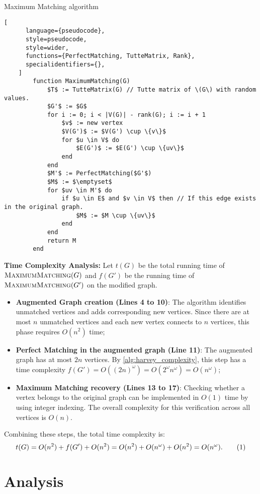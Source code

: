 \begin{programruledcaption}{Maximum Matching algorithm}
    \begin{lstlisting}[
      language={pseudocode},
      style=pseudocode,
      style=wider,
      functions={PerfectMatching, TutteMatrix, Rank},
      specialidentifiers={},
    ]
        function MaximumMatching(G)
            $T$ := TutteMatrix(G) // Tutte matrix of \(G\) with random values.
            $G'$ := $G$
            for i := 0; i < |V(G)| - rank(G); i := i + 1 
                $v$ := new vertex
                $V(G')$ := $V(G') \cup \{v\}$
                for $u \in V$ do 
                    $E(G')$ := $E(G') \cup \{uv\}$
                end
            end
            $M'$ := PerfectMatching($G'$)
            $M$ := $\emptyset$
            for $uv \in M'$ do 
                if $u \in E$ and $v \in V$ then // If this edge exists in the original graph.
                    $M$ := $M \cup \{uv\}$
                end
            end
            return M
        end
    \end{lstlisting}
\end{programruledcaption}
\noindent
\textbf{Time Complexity Analysis:} Let \(t(G)\) be the total running time of \(\textsc{MaximumMatching}(G)\) and \(f(G')\) be the running time of \(\textsc{MaximumMatching}(G')\) on the modified graph.
\begin{itemize}
\item \textbf{Augmented Graph creation (Lines 4 to 10)}:
The algorithm identifies unmatched vertices and adds corresponding new vertices. 
Since there are at most \(n\) unmatched vertices and each new vertex connects to \(n\) vertices, this phase requires \(O(n^2)\) time;

\item \textbf{Perfect Matching in the augmented graph (Line 11)}: 
The augmented graph has at most \(2n\) vertices. 
By \cref{alg:harvey_complexity}, this step has a time complexity  \(f(G') = O((2n)^\omega) = O(2^\omega n^\omega) = O(n^\omega)\);

\item \textbf{Maximum Matching recovery (Lines 13 to 17)}: 
Checking whether a vertex belongs to the original graph can be implemented in \(O(1)\) time by using integer indexing. 
The overall complexity for this verification across all vertices is \(O(n)\).
\end{itemize}
Combining these steps, the total time complexity is:
\[
t(G) = O(n^2) + f(G') + O(n^2) = O(n^2) + O(n^\omega) + O(n^2) = O(n^\omega). \numberthis \label{alg:maximum_matching_complexity}
\]

\section{Analysis}